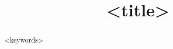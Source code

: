 \documentclass[11pt]{llncs}
\title{<title>}
\begin{document}
  \maketitle
  \begin{abstract}
    
    <keywords>
  \end{abstract}
  
  
  
  
\end{document}
